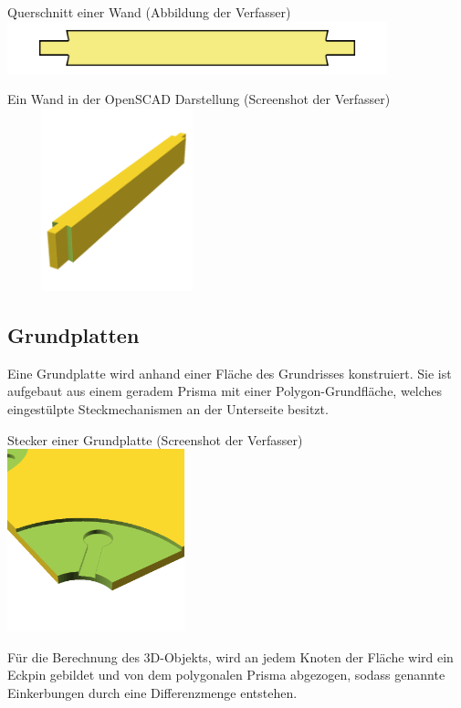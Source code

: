 \begin{Bild}{Querschnitt einer Wand (Abbildung der Verfasser)}
	\includegraphics[width = 110mm]{Bilder/Wand2D-04}
\end{Bild}

\begin{Bild}{Ein Wand in der OpenSCAD Darstellung (Screenshot der Verfasser)}
	\includegraphics[height=200px, width=240px]{Bilder/Untereinheit_Wand}
\end{Bild}

\subsection{Grundplatten}
\label{gr}
Eine Grundplatte wird anhand einer Fläche des Grundrisses konstruiert.
Sie ist aufgebaut aus einem geradem Prisma mit einer Polygon-Grundfläche, welches eingestülpte Steckmechanismen an der Unterseite besitzt.

\begin{Bild}{Stecker einer Grundplatte (Screenshot der Verfasser)}
	\includegraphics[height=200px]{Bilder/Untereinheit_GP}
\end{Bild}

Für die Berechnung des 3D-Objekts, wird an jedem Knoten der Fläche wird ein Eckpin gebildet und von dem polygonalen Prisma abgezogen, sodass genannte Einkerbungen durch eine Differenzmenge entstehen. 

